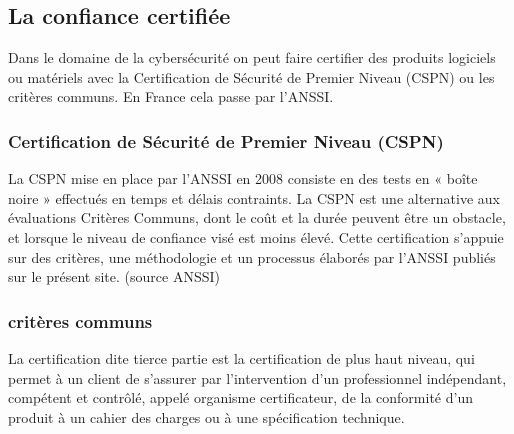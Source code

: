 \subsection{La confiance certifiée}

Dans le domaine de la cybersécurité on peut faire certifier des produits logiciels ou matériels avec la Certification de Sécurité de Premier Niveau (CSPN) ou les critères communs. En France cela passe par l'ANSSI.

\subsubsection{Certification de Sécurité de Premier Niveau (CSPN)}
La CSPN mise en place par l’ANSSI en 2008 consiste en des tests en « boîte noire » effectués en temps et délais contraints. La CSPN est une alternative aux évaluations Critères Communs, dont le coût et la durée peuvent être un obstacle, et lorsque le niveau de confiance visé est moins élevé. Cette certification s’appuie sur des critères, une méthodologie et un processus élaborés par l’ANSSI publiés sur le présent site.
(source ANSSI)

\subsubsection{critères communs}
La certification dite tierce partie est la certification de plus haut niveau, qui permet à un client de s’assurer par l’intervention d’un professionnel indépendant, compétent et contrôlé, appelé organisme certificateur, de la conformité d’un produit à un cahier des charges ou à une spécification technique. 

